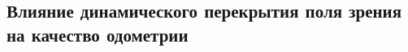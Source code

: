 \subsection{Влияние динамического перекрытия поля зрения на качество одометрии}
\label{sec:1-3-dynamic-occlusions}

